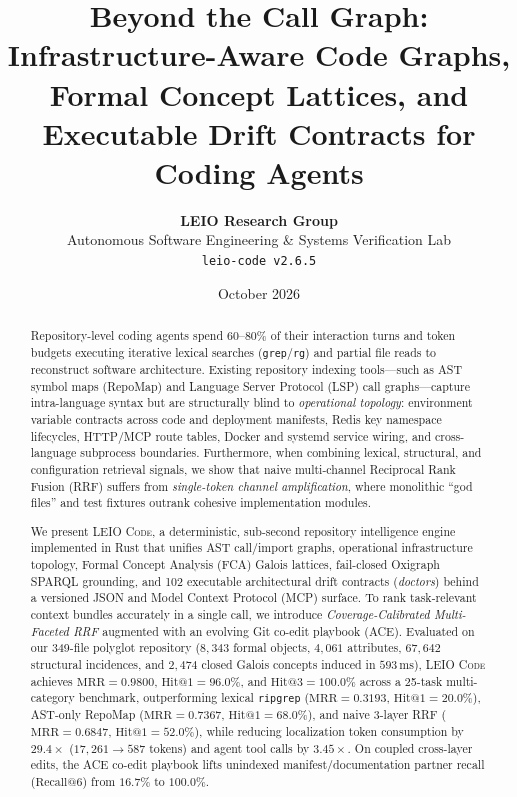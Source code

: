 \documentclass[11pt]{article}
\title{\textbf{Beyond the Call Graph: Infrastructure-Aware Code Graphs, Formal Concept Lattices, and Executable Drift Contracts for Coding Agents}}
\author{
  \textbf{LEIO Research Group} \\
  Autonomous Software Engineering \& Systems Verification Lab \\
  \texttt{leio-code v2.6.5}
}
\date{October 2026}
\begin{document}
\maketitle

\begin{abstract}
Repository-level coding agents spend $60\text{--}80\%$ of their interaction turns and token budgets executing iterative lexical searches (\texttt{grep}/\texttt{rg}) and partial file reads to reconstruct software architecture. Existing repository indexing tools—such as AST symbol maps (RepoMap) and Language Server Protocol (LSP) call graphs—capture intra-language syntax but are structurally blind to \emph{operational topology}: environment variable contracts across code and deployment manifests, Redis key namespace lifecycles, HTTP/MCP route tables, Docker and systemd service wiring, and cross-language subprocess boundaries. Furthermore, when combining lexical, structural, and configuration retrieval signals, we show that naive multi-channel Reciprocal Rank Fusion (RRF) suffers from \emph{single-token channel amplification}, where monolithic ``god files'' and test fixtures outrank cohesive implementation modules.

We present \textsc{LEIO Code}, a deterministic, sub-second repository intelligence engine implemented in Rust that unifies AST call/import graphs, operational infrastructure topology, Formal Concept Analysis (FCA) Galois lattices, fail-closed Oxigraph SPARQL grounding, and 102 executable architectural drift contracts (\emph{doctors}) behind a versioned JSON and Model Context Protocol (MCP) surface. To rank task-relevant context bundles accurately in a single call, we introduce \emph{Coverage-Calibrated Multi-Faceted RRF} augmented with an evolving Git co-edit playbook (ACE). Evaluated on our 349-file polyglot repository ($8{,}343$ formal objects, $4{,}061$ attributes, $67{,}642$ structural incidences, and $2{,}474$ closed Galois concepts induced in $593\,\text{ms}$), \textsc{LEIO Code} achieves $\text{MRR} = 0.9800$, $\text{Hit@1} = 96.0\%$, and $\text{Hit@3} = 100.0\%$ across a 25-task multi-category benchmark, outperforming lexical \texttt{ripgrep} ($\text{MRR} = 0.3193$, $\text{Hit@1} = 20.0\%$), AST-only RepoMap ($\text{MRR} = 0.7367$, $\text{Hit@1} = 68.0\%$), and naive 3-layer RRF ($\text{MRR} = 0.6847$, $\text{Hit@1} = 52.0\%$), while reducing localization token consumption by $29.4\times$ ($17{,}261 \to 587$ tokens) and agent tool calls by $3.45\times$. On coupled cross-layer edits, the ACE co-edit playbook lifts unindexed manifest/documentation partner recall ($\text{Recall@6}$) from $16.7\%$ to $100.0\%$.
\end{abstract}
\end{document}
